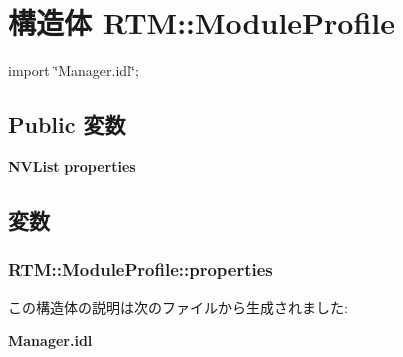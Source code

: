 \section{構造体 RTM::ModuleProfile}
\label{structRTM_1_1ModuleProfile}


{\ttfamily import \char`\"{}Manager.idl\char`\"{};}

\subsection*{Public 変数}
\begin{DoxyCompactItemize}
\item 
{\bf NVList} {\bf properties}
\end{DoxyCompactItemize}


\subsection{変数}
\subsubsection[{properties}]{ {\bf RTM::ModuleProfile::properties}}\label{structRTM_1_1ModuleProfile_a50998e1c3e346b22e480cff93ff73eb1}


この構造体の説明は次のファイルから生成されました:\begin{DoxyCompactItemize}
\item 
{\bf Manager.idl}\end{DoxyCompactItemize}
